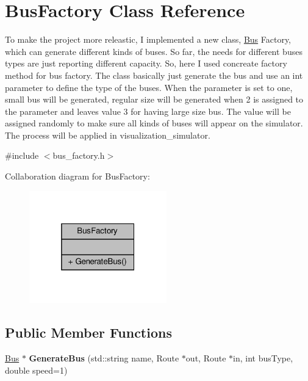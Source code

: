 \hypertarget{classBusFactory}{}\section{Bus\+Factory Class Reference}
\label{classBusFactory}


To make the project more releastic, I implemented a new class, \hyperlink{classBus}{Bus} Factory, which can generate different kinds of buses. So far, the needs for different buses types are just reporting different capacity. So, here I used concreate factory method for bus factory. The class basically just generate the bus and use an int parameter to define the type of the buses. When the parameter is set to one, small bus will be generated, regular size will be generated when 2 is assigned to the parameter and leaves value 3 for having large size bus. The value will be assigned randomly to make sure all kinds of buses will appear on the simulator. The process will be applied in visualization\+\_\+simulator.  




{\ttfamily \#include $<$bus\+\_\+factory.\+h$>$}



Collaboration diagram for Bus\+Factory\+:\nopagebreak
\begin{figure}[H]
\begin{center}
\leavevmode
\includegraphics[width=169pt]{classBusFactory__coll__graph}
\end{center}
\end{figure}
\subsection*{Public Member Functions}
\begin{DoxyCompactItemize}
\item 
\mbox{\label{classBusFactory_a9abc9e67cb64f771a29f5f63513c61f5}} 
\hyperlink{classBus}{Bus} $\ast$ {\bfseries Generate\+Bus} (std\+::string name, Route $\ast$out, Route $\ast$in, int bus\+Type, double speed=1)
\end{DoxyCompactItemize}


